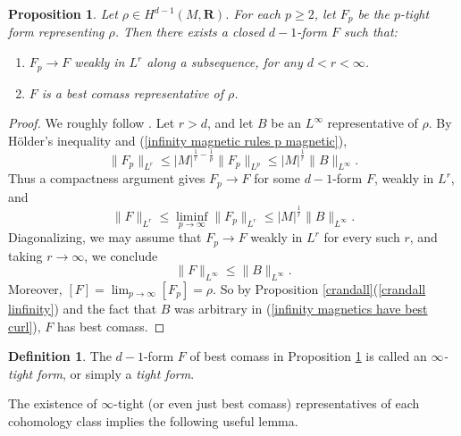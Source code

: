 \documentclass[reqno,11pt]{amsart}
\newcommand{\RR}{\mathbf{R}}
\newcommand{\dfn}[1]{\emph{#1}\index{#1}}
\newtheorem{proposition}[theorem]{Proposition}
\theoremstyle{definition}
\newtheorem{definition}[theorem]{Definition}
\numberwithin{equation}{section}
\begin{document}
\begin{proposition}\label{existence infinity}
Let $\rho \in H^{d - 1}(M, \RR)$.
For each $p \geq 2$, let $F_p$ be the $p$-tight form representing $\rho$. Then there exists a closed $d - 1$-form $F$ such that:
\begin{enumerate}
\item $F_p \to F$ weakly in $L^r$ along a subsequence, for any $d < r < \infty$.
\item $F$ is a best comass representative of $\rho$.
\end{enumerate}
\end{proposition}
\begin{proof}
We roughly follow \cite[\S3]{Lindqvist14}.
Let $r > d$, and let $B$ be an $L^\infty$ representative of $\rho$.
By H\"older's inequality and (\ref{infinity magnetic rules p magnetic}),
\begin{equation}\label{uniform bounds in p by best curl}
	\|F_p\|_{L^r} \leq |M|^{\frac{1}{r} - \frac{1}{p}} \|F_p\|_{L^p} \leq |M|^{\frac{1}{r}} \|B\|_{L^\infty}.
\end{equation}
Thus a compactness argument gives $F_p \to F$ for some $d - 1$-form $F$, weakly in $L^r$, and 
$$\|F\|_{L^r} \leq \liminf_{p \to \infty} \|F_p\|_{L^r} \leq |M|^{\frac{1}{r}} \|B\|_{L^\infty}.$$
Diagonalizing, we may assume that $F_p \to F$ weakly in $L^r$ for every such $r$, and taking $r \to \infty$, we conclude 
\begin{equation}\label{infinity magnetics have best curl}
	\|F\|_{L^\infty} \leq \|B\|_{L^\infty}.
\end{equation}
Moreover, $[F] = \lim_{p \to \infty} [F_p] = \rho$.
So by Proposition \ref{crandall}(\ref{crandall linfinity}) and the fact that $B$ was arbitrary in (\ref{infinity magnetics have best curl}), $F$ has best comass.
\end{proof}

\begin{definition}
The $d - 1$-form $F$ of best comass in Proposition \ref{existence infinity} is called an \dfn{$\infty$-tight form}, or simply a \dfn{tight form}.
\end{definition}

The existence of $\infty$-tight (or even just best comass) representatives of each cohomology class implies the following useful lemma.
\end{document}
